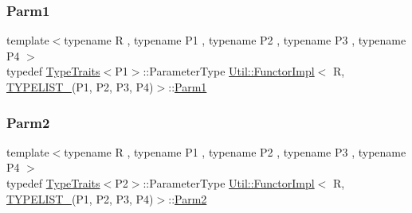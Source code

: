 \subsubsection{\texorpdfstring{Parm1}{Parm1}\hspace{0.1cm}{\footnotesize\ttfamily [3/3]}}
{\footnotesize\ttfamily template$<$typename R , typename P1 , typename P2 , typename P3 , typename P4 $>$ \\
typedef \mbox{\hyperlink{classUtil_1_1TypeTraits}{Type\+Traits}}$<$P1$>$\+::Parameter\+Type \mbox{\hyperlink{classUtil_1_1FunctorImpl}{Util\+::\+Functor\+Impl}}$<$ R, \mbox{\hyperlink{adat__devel__install_2include_2adat_2typelist_8h_a7a156c571ab21a16b0495e1c882a07fa}{T\+Y\+P\+E\+L\+I\+S\+T\+\_}}(P1, P2, P3, P4)$>$\+::\mbox{\hyperlink{structUtil_1_1Private_1_1FunctorImplBase_a9d61e693d6c616dea5bd9d9073c7d21a}{Parm1}}}

\mbox{\label{classUtil_1_1FunctorImpl_3_01R_00_01TYPELIST__4_07P1_00_01P2_00_01P3_00_01P4_08_4_aaf289567dfbd9f3379db79d06f02f4a7}} 
\subsubsection{\texorpdfstring{Parm2}{Parm2}\hspace{0.1cm}{\footnotesize\ttfamily [1/3]}}
{\footnotesize\ttfamily template$<$typename R , typename P1 , typename P2 , typename P3 , typename P4 $>$ \\
typedef \mbox{\hyperlink{classUtil_1_1TypeTraits}{Type\+Traits}}$<$P2$>$\+::Parameter\+Type \mbox{\hyperlink{classUtil_1_1FunctorImpl}{Util\+::\+Functor\+Impl}}$<$ R, \mbox{\hyperlink{adat__devel__install_2include_2adat_2typelist_8h_a7a156c571ab21a16b0495e1c882a07fa}{T\+Y\+P\+E\+L\+I\+S\+T\+\_}}(P1, P2, P3, P4)$>$\+::\mbox{\hyperlink{structUtil_1_1Private_1_1FunctorImplBase_a554085cd798ef14838a59b528f0feb2e}{Parm2}}}

\mbox{\label{classUtil_1_1FunctorImpl_3_01R_00_01TYPELIST__4_07P1_00_01P2_00_01P3_00_01P4_08_4_aaf289567dfbd9f3379db79d06f02f4a7}} 
